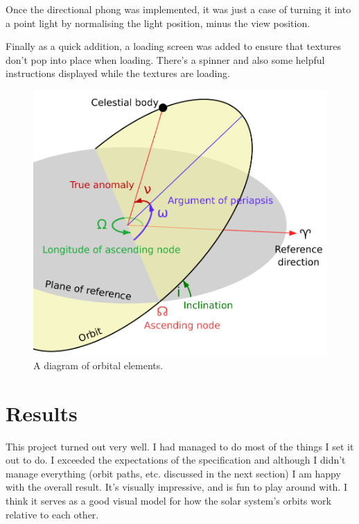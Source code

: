 \documentclass{scrreprt}
\begin{document}
Once the directional phong was implemented, it was just a case of turning it into a point light by normalising the light position, minus the view position.

Finally as a quick addition, a loading screen was added to ensure that textures don't pop into place when loading. There's a spinner and also some helpful instructions displayed while the textures are loading.

\begin{figure}[H]
\includegraphics[width=\textwidth]{images/orbital-elements}
\caption{A diagram of orbital elements.\cite{orbitalelements}}
\end{figure}

\chapter{Results}

This project turned out very well. I had managed to do most of the things I set it out to do. I exceeded the expectations of the specification and although I didn't manage everything (orbit paths, etc. discussed in the next section) I am happy with the overall result. It's visually impressive, and is fun to play around with. I think it serves as a good visual model for how the solar system's orbits work relative to each other.
\end{document}
